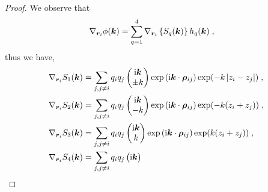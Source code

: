 \begin{proof}
We observe that 
\begin{align*}
 \nabla_{\bm{r}_i}\phi(\bm{k})&=   \sum_{q=1}^4 \nabla_{\bm{r}_i}\left\{S_q(\bm{k})\right\}h_q(\bm{k})\;,
\end{align*}
thus we have,
\begin{align*}
 \nabla_{\bm{r}_i} S_1(\bm{k})&=\sum_{j,j\neq i}q_iq_j   \begin{pmatrix} \mathrm{i} \boldsymbol{k} \\
 \pm k  \end{pmatrix}\exp{(\mathrm{i} \boldsymbol{k} \cdot \boldsymbol{\rho}_{ij})}\exp(-k\left\lvert z_i-z_j\right\rvert)\;,\\
 \nabla_{\bm{r}_i} S_2(\bm{k})&=\sum_{j,j\neq i}q_iq_j   \begin{pmatrix} \mathrm{i} \boldsymbol{k} \\
 -k  \end{pmatrix}\exp{(\mathrm{i} \boldsymbol{k} \cdot \boldsymbol{\rho}_{ij})}\exp(-k(z_i+z_j))\;,\\
  \nabla_{\bm{r}_i} S_3(\bm{k})&=\sum_{j,j\neq i}q_iq_j   \begin{pmatrix} \mathrm{i} \boldsymbol{k} \\
 k  \end{pmatrix}\exp{(\mathrm{i} \boldsymbol{k} \cdot \boldsymbol{\rho}_{ij})}\exp(k(z_i+z_j))\;,\\
 \nabla_{\bm{r}_i} S_4(\bm{k})&=\sum_{j,j\neq i}q_iq_j   \begin{pmatrix} \mathrm{i} \boldsymbol{k} \\

\end{pmatrix}
\end{align*}
\end{proof}
